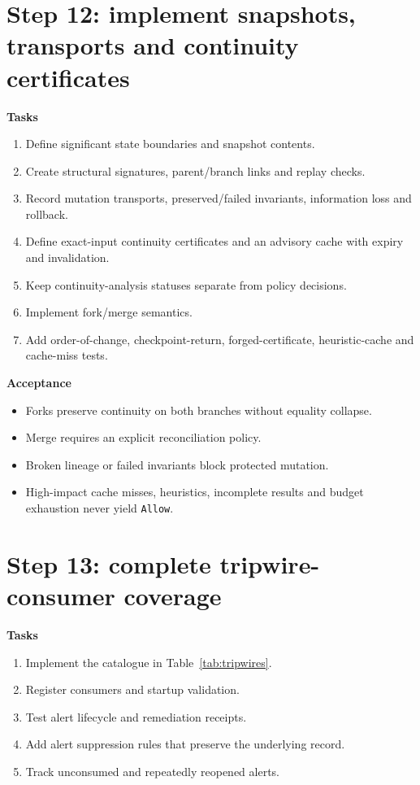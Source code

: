 \documentclass[11pt,oneside]{report}
\begin{document}
\section{Step 12: implement snapshots, transports and continuity certificates}

\textbf{Tasks}
\begin{enumerate}
  \item Define significant state boundaries and snapshot contents.
  \item Create structural signatures, parent/branch links and replay checks.
  \item Record mutation transports, preserved/failed invariants, information loss and rollback.
  \item Define exact-input continuity certificates and an advisory cache with expiry and invalidation.
  \item Keep continuity-analysis statuses separate from policy decisions.
  \item Implement fork/merge semantics.
  \item Add order-of-change, checkpoint-return, forged-certificate, heuristic-cache and cache-miss tests.
\end{enumerate}

\textbf{Acceptance}
\begin{itemize}
  \item Forks preserve continuity on both branches without equality collapse.
  \item Merge requires an explicit reconciliation policy.
  \item Broken lineage or failed invariants block protected mutation.
  \item High-impact cache misses, heuristics, incomplete results and budget exhaustion never yield \texttt{Allow}.
\end{itemize}

\section{Step 13: complete tripwire-consumer coverage}

\textbf{Tasks}
\begin{enumerate}
  \item Implement the catalogue in Table~\ref{tab:tripwires}.
  \item Register consumers and startup validation.
  \item Test alert lifecycle and remediation receipts.
  \item Add alert suppression rules that preserve the underlying record.
  \item Track unconsumed and repeatedly reopened alerts.
\end{enumerate}
\end{document}
